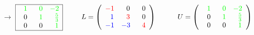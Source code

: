 	$\rightarrow$
	$\begin{array}{|ccc|}
			\hline 
			\color{green}\ \ 1 & \color{green}\ \ 0 & \color{green}-2\\
			\ \ 0 & \color{green}\ \ 1 & \color{green}\ \ \frac 5 3\\
			\ \ 0 & \ \ 0 & \color{green}\ \ 1\\
			\hline
	\end{array}$\ \ \ \ \	
	$L=	\left(\begin{array}{ccc}
			\color{red}-1 &\ \ 0 &\ \ 0\\
		 	\color{blue}\ \ 1 &\color{red}\ \ 3 &\ \ 0\\
			\color{blue}-1 &\color{blue} -3 &\color{red}\ \ 4\\
	\end{array}\right)$\ \ \ \ \ \ 
	$U=	\left(\begin{array}{ccc}
			\color{green}\ \ 1 &\color{green}\ \ 0 &\color{green}-2\\
		 	\ \ 0 &\color{green}\ \ 1 &\color{green}\ \ \frac 5 3\\
			\ \ 0 &\ \ 0 &\color{green}\ \ 1\\
	\end{array}\right)$\\
		
